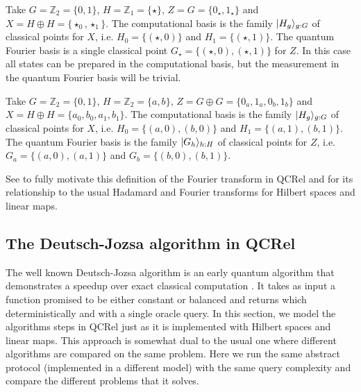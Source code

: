\begin{example}
Take $G=\mathbb{Z}_2=\{0,1\}$, $H=\mathbb{Z}_1=\{\star\}$, $Z = G = \{ 0_\star,1_\star \}$ and $X=H\oplus H = \{ \star_0,\star_1 \}$. The computational basis is the family $| H_g \rangle_{g:G}$ of classical points for $X$, i.e. $H_0 = \{(\star,0)\}$ and $H_1 = \{(\star,1)\}$. The quantum Fourier basis is a single classical point $G_\star = \{(\star,0), (\star,1)\}$ for $Z$. In this case all states can be prepared in the computational basis, but the measurement in the quantum Fourier basis will be trivial.
\end{example}

\begin{example}
Take $G=\mathbb{Z}_2=\{0,1\}$, $H=\mathbb{Z}_2=\{a,b\}$, $Z = G \oplus G = \{ 0_a,1_a,0_b,1_b\}$ and $X= H \oplus H = \{ a_0, b_0, a_1, b_1 \}$. The computational basis is the family $| H_g \rangle_{g:G}$ of classical points for $X$, i.e. $H_0 = \{(a,0),(b,0)\}$ and $H_1 = \{(a,1),(b,1)\}$. The quantum Fourier basis is the family $| G_h \rangle_{h:H}$ of classical points for $Z$, i.e. $G_a = \{(a,0),(a,1)\}$ and $G_b = \{(b,0),(b,1)\}$.
\end{example}

See \cite{strongCompFT} to fully motivate this definition of the Fourier transform in QCRel and for its relationship to the usual Hadamard and Fourier transforms for Hilbert spaces and linear maps.

\subsection{The Deutsch-Jozsa algorithm in QCRel}

The well known Deutsch-Jozsa algorithm is an early quantum algorithm that demonstrates a speedup over exact classical computation \cite{deutsch1992rapid}. It takes as input a function promised to be either constant or balanced and returns which deterministically and with a single oracle query. In this section, we model the algorithms steps in QCRel just as it is implemented with Hilbert spaces and linear maps. This approach is somewhat dual to the usual one where different algorithms are compared on the same problem. Here we run the same abstract protocol (implemented in a different model) with the same query complexity and compare the different problems that it solves.


